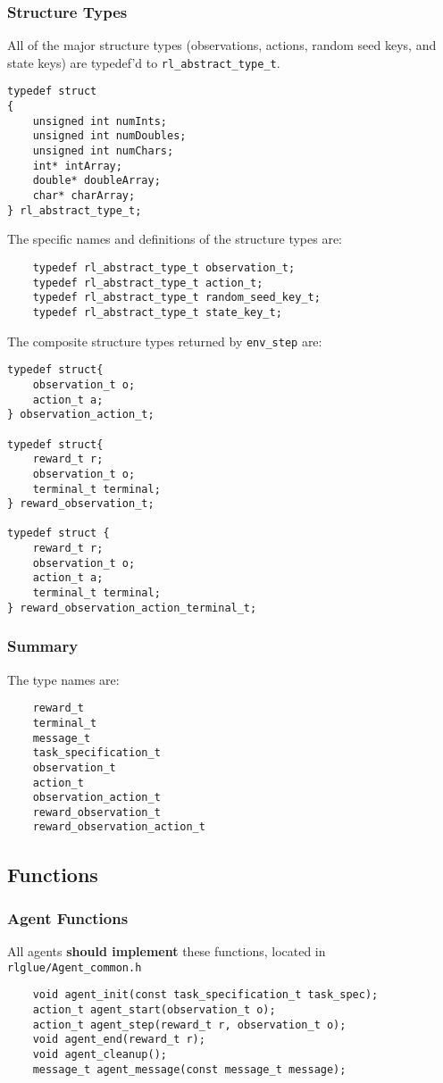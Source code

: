 \documentclass[11pt]{article}
\begin{document}
\def\rat{rl\_abstract\_type\_t}

\subsubsection{Structure Types}
\label{sec:structure-types}
All of the major structure types (observations, actions, random seed keys, and state keys) are typedef'd to \texttt{\rat}.

\begin{verbatim}
typedef struct
{
    unsigned int numInts;
    unsigned int numDoubles;
    unsigned int numChars;
    int* intArray;
    double* doubleArray;
    char* charArray;
} rl_abstract_type_t;
\end{verbatim}

The specific names and definitions of the structure types are:
\begin{verbatim}
    typedef rl_abstract_type_t observation_t;
    typedef rl_abstract_type_t action_t;
    typedef rl_abstract_type_t random_seed_key_t;
    typedef rl_abstract_type_t state_key_t;
\end{verbatim}

The composite structure types returned by \texttt{env\_step} are:
\begin{verbatim}
typedef struct{
    observation_t o;
    action_t a;
} observation_action_t;

typedef struct{
    reward_t r;
    observation_t o;
    terminal_t terminal;
} reward_observation_t;

typedef struct {
    reward_t r;
    observation_t o;
    action_t a;
    terminal_t terminal;
} reward_observation_action_terminal_t;
\end{verbatim}

\subsubsection{Summary}
The type names are:
\begin{verbatim}
    reward_t
    terminal_t
    message_t
    task_specification_t
    observation_t
    action_t
    observation_action_t
    reward_observation_t
    reward_observation_action_t
\end{verbatim}


\subsection{Functions}
\subsubsection{Agent Functions}
All agents \textbf{should implement} these functions, located in \texttt{rlglue/Agent\_common.h}
\begin{verbatim}
    void agent_init(const task_specification_t task_spec);
    action_t agent_start(observation_t o);
    action_t agent_step(reward_t r, observation_t o);
    void agent_end(reward_t r);  
    void agent_cleanup();
    message_t agent_message(const message_t message);
\end{verbatim}
\end{document}
